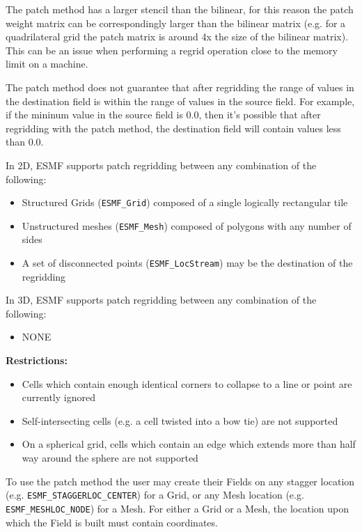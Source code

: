  The patch method has a larger stencil than the bilinear, for this reason the patch weight matrix can be correspondingly larger
 than the bilinear matrix (e.g. for a quadrilateral grid the patch matrix is around 4x the size of
 the bilinear matrix). This can be an issue when performing a regrid operation close to the memory
 limit on a machine. 

  The patch method does not guarantee that after regridding the range of values in the destination field is within the range of 
 values in the source field. For example, if the mininum value in the source field is 0.0, then it's possible that after regridding with the 
 patch method, the destination field will contain values less than 0.0.

\smallskip

 In 2D, ESMF supports patch regridding between any combination of the following:
 \begin{itemize}
 \item Structured Grids ({\tt ESMF\_Grid}) composed of a single logically rectangular tile
 \item Unstructured meshes ({\tt ESMF\_Mesh}) composed of polygons with any number of sides
 \item A set of disconnected points ({\tt ESMF\_LocStream}) may be the destination of the regridding
 \end{itemize}

\smallskip

 In 3D, ESMF supports patch regridding between any combination of the following:
 \begin{itemize}
 \item NONE
 \end{itemize}

\smallskip

{\bf Restrictions:}
 \begin{itemize}
 \item Cells which contain enough identical corners to collapse to a line or point are currently ignored
 \item Self-intersecting cells (e.g. a cell twisted into a bow tie) are not supported
 \item On a spherical grid, cells which contain an edge which extends more than half way around the sphere are not supported 
 \end{itemize}

 To use the patch method the user may create their Fields on any stagger location (e.g. {\tt ESMF\_STAGGERLOC\_CENTER}) for a Grid, or
 any Mesh location (e.g. {\tt ESMF\_MESHLOC\_NODE}) for a Mesh. For either a Grid or a Mesh, the location upon which the Field is built 
 must contain coordinates. 

